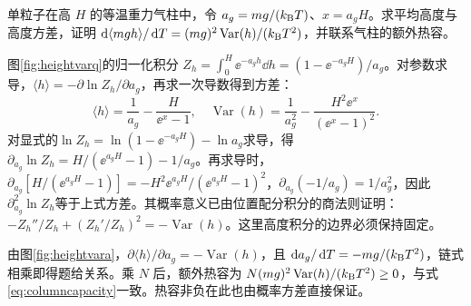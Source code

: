 \begin{exercise}[有限气柱高度的涨落]
单粒子在高 $H$ 的等温重力气柱中，令 $a_g=mg/(k_{\mathrm B} T)$、$x=a_gH$。求平均高度与高度方差，证明 $\mathop{}\!\mathrm d\langle mgh\rangle/\mathop{}\!\mathrm d T=(mg)^2\operatorname{Var}(h)/(k_{\mathrm B} T^2)$，并联系气柱的额外热容。
\end{exercise}
\begin{solution}
图\ref{fig:heightvarq}的归一化积分 $Z_h=\int_0^H\ee^{-a_gh}\dd h=(1-\ee^{-a_gH})/a_g$。对参数求导，$\langle h\rangle=-\partial\ln Z_h/\partial a_g$，再求一次导数得到方差：
\[
 \langle h\rangle=\frac1{a_g}-\frac H{\ee^x-1},\quad
 \operatorname{Var}(h)=\frac1{a_g^2}-\frac{H^2\ee^x}{(\ee^x-1)^2}.
\]
对显式的$\ln Z_h=\ln(1-\ee^{-a_gH})-\ln a_g$求导，得$\partial_{a_g}\ln Z_h=H/(\ee^{a_gH}-1)-1/a_g$。再求导时，$\partial_{a_g}[H/(\ee^{a_gH}-1)]=-H^2\ee^{a_gH}/(\ee^{a_gH}-1)^2$，$\partial_{a_g}(-1/a_g)=1/a_g^2$，因此$\partial_{a_g}^2\ln Z_h$等于上式方差。其概率意义已由位置配分积分的商法则证明：$-Z_h''/Z_h+(Z_h'/Z_h)^2=-\operatorname{Var}(h)$。这里高度积分的边界必须保持固定。

由图\ref{fig:heightvara}，$\partial\langle h\rangle/\partial a_g=-\operatorname{Var}(h)$，且 $\mathop{}\!\mathrm d a_g/\mathop{}\!\mathrm d T=-mg/(k_{\mathrm B} T^2)$，链式相乘即得题给关系。乘 $N$ 后，额外热容为 $N(mg)^2\operatorname{Var}(h)/(k_{\mathrm B} T^2)\ge0$，与式\eqref{eq:columncapacity}一致。热容非负在此也由概率方差直接保证。
\end{solution}

